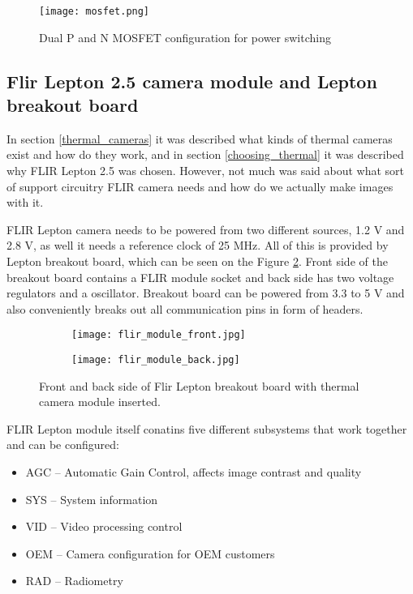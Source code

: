 \begin{figure}[ht]
        \centering
        \texttt{[image: mosfet.png]} 
        \caption{ Dual P and N MOSFET configuration for power switching}
        \label{mosfet}
\end{figure}

\subsection{ Flir Lepton 2.5 camera module and Lepton breakout board}

In section \ref{thermal_cameras} it was described what kinds of thermal cameras exist and how do they work, and in section \ref{choosing_thermal} it was described why FLIR Lepton 2.5 was chosen.
However, not much was said about what sort of support circuitry FLIR camera needs and how do we actually make images with it.

FLIR Lepton camera needs to be powered from two different sources, 1.2 \si{\volt} and 2.8 \si{\volt}, as well it needs a reference clock of 25 \si{\mega\hertz}.
All of this is provided by Lepton breakout board, which can be seen on the Figure \ref{lepton_breakout}.
Front side of the breakout board contains a FLIR module socket and back side has two voltage regulators and a oscillator.
Breakout board can be powered from 3.3 to 5 \si{\volt} and also conveniently breaks out all communication pins in form of headers.

\begin{figure}[ht] 
    \begin{subfigure}[b]{0.5\textwidth}
        \centering
        \texttt{[image: flir\_module\_front.jpg]} 
    \end{subfigure}
    \begin{subfigure}[b]{0.5\textwidth}
        \centering
        \texttt{[image: flir\_module\_back.jpg]} 
    \end{subfigure}
    \caption{ Front and back side of Flir Lepton breakout board with thermal camera module inserted.}
    \label{lepton_breakout}
\end{figure}

FLIR Lepton module itself conatins five different subsystems that work together and can be configured:

\begin{itemize}
    \item AGC – Automatic Gain Control, affects image contrast and quality
    \item SYS – System information
    \item VID – Video processing control
    \item OEM – Camera configuration for OEM customers
    \item RAD – Radiometry
\end{itemize}

